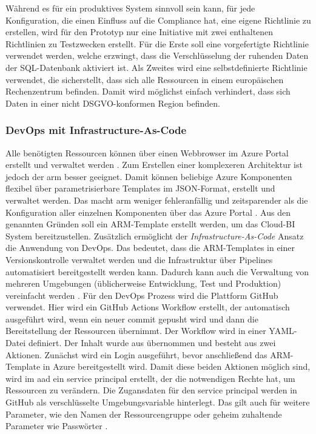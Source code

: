 Während es für ein produktives System sinnvoll sein kann, für jede Konfiguration, die einen Einfluss auf die Compliance hat, eine eigene Richtlinie zu erstellen, wird für den Prototyp nur eine Initiative mit zwei enthaltenen Richtlinien zu Testzwecken erstellt. Für die Erste soll eine vorgefertigte Richtlinie verwendet werden, welche erzwingt, dass die Verschlüsselung der ruhenden Daten der SQL-Datenbank aktiviert ist. Als Zweites wird eine selbstdefinierte Richtlinie verwendet, die sicherstellt, dass sich alle Ressourcen in einem europäischen Rechenzentrum befinden. Damit wird möglichst einfach verhindert, dass sich Daten in einer nicht DSGVO-konformen Region befinden.

\subsubsection{DevOps mit Infrastructure-As-Code} \label{subsec:infra:konfig:policy}
Alle benötigten Ressourcen können über einen Webbrowser im Azure Portal erstellt und verwaltet werden \cite{chilberto_building_2020}. Zum Erstellen einer komplexeren Architektur ist jedoch der \ac{arm} besser geeignet. Damit können beliebige Azure Komponenten flexibel über parametrisierbare Templates im JSON-Format, erstellt und verwaltet werden. Das macht \ac{arm} weniger fehleranfällig und zeitsparender als die Konfiguration aller einzelnen Komponenten über das Azure Portal \cite{monadjemi_azure-administration_2017}. Aus den genannten Gründen soll ein ARM-Template erstellt werden, um das Cloud-BI System bereitzustellen. Zusätzlich ermöglicht der \textit{Infrastructure-As-Code} Ansatz die Anwendung von DevOps. Das bedeutet, dass die ARM-Templates in einer Versionskontrolle verwaltet werden und die Infrastruktur über Pipelines automatisiert bereitgestellt werden kann. Dadurch kann auch die Verwaltung von mehreren Umgebungen (üblicherweise Entwicklung, Test und Produktion) vereinfacht werden \cite{riscutia_data_2021}. Für den DevOps Prozess wird die Plattform GitHub verwendet. Hier wird ein GitHub Actions Workflow erstellt, der automatisch ausgeführt wird, wenn ein neuer commit gepusht wird und dann die Bereitstellung der Ressourcen übernimmt. Der Workflow wird in einer YAML-Datei definiert. Der Inhalt wurde aus  übernommen und besteht aus zwei Aktionen. Zunächst wird ein Login ausgeführt, bevor anschließend das ARM-Template in Azure bereitgestellt wird. Damit diese beiden Aktionen möglich sind, wird im \ac{aad} ein service principal erstellt, der die notwendigen Rechte hat, um Ressourcen zu verändern. Die Zugansdaten für den service principal werden in GitHub als verschlüsselte Umgebungsvariable hinterlegt. Das gilt auch für weitere Parameter, wie den Namen der Ressourcengruppe oder geheim zuhaltende Parameter wie Passwörter \cite[vgl.][]{rendon_deploy_2022}.

